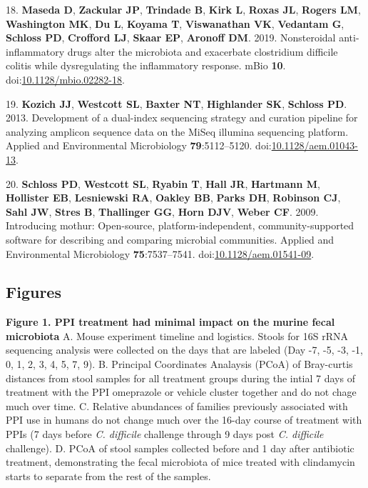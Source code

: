 \documentclass[11pt,]{article}
\begin{document}
\hypertarget{ref-Maseda2019}{}
18. \textbf{Maseda D}, \textbf{Zackular JP}, \textbf{Trindade B},
\textbf{Kirk L}, \textbf{Roxas JL}, \textbf{Rogers LM},
\textbf{Washington MK}, \textbf{Du L}, \textbf{Koyama T},
\textbf{Viswanathan VK}, \textbf{Vedantam G}, \textbf{Schloss PD},
\textbf{Crofford LJ}, \textbf{Skaar EP}, \textbf{Aronoff DM}. 2019.
Nonsteroidal anti-inflammatory drugs alter the microbiota and exacerbate
clostridium difficile colitis while dysregulating the inflammatory
response. mBio \textbf{10}.
doi:\href{https://doi.org/10.1128/mbio.02282-18}{10.1128/mbio.02282-18}.

\hypertarget{ref-Kozich2013}{}
19. \textbf{Kozich JJ}, \textbf{Westcott SL}, \textbf{Baxter NT},
\textbf{Highlander SK}, \textbf{Schloss PD}. 2013. Development of a
dual-index sequencing strategy and curation pipeline for analyzing
amplicon sequence data on the MiSeq illumina sequencing platform.
Applied and Environmental Microbiology \textbf{79}:5112--5120.
doi:\href{https://doi.org/10.1128/aem.01043-13}{10.1128/aem.01043-13}.

\hypertarget{ref-Schloss2009}{}
20. \textbf{Schloss PD}, \textbf{Westcott SL}, \textbf{Ryabin T},
\textbf{Hall JR}, \textbf{Hartmann M}, \textbf{Hollister EB},
\textbf{Lesniewski RA}, \textbf{Oakley BB}, \textbf{Parks DH},
\textbf{Robinson CJ}, \textbf{Sahl JW}, \textbf{Stres B},
\textbf{Thallinger GG}, \textbf{Horn DJV}, \textbf{Weber CF}. 2009.
Introducing mothur: Open-source, platform-independent,
community-supported software for describing and comparing microbial
communities. Applied and Environmental Microbiology
\textbf{75}:7537--7541.
doi:\href{https://doi.org/10.1128/aem.01541-09}{10.1128/aem.01541-09}.

\newpage

\subsection{Figures}\label{figures}

\textbf{Figure 1. PPI treatment had minimal impact on the murine fecal
microbiota} A. Mouse experiment timeline and logistics. Stools for 16S
rRNA sequencing analysis were collected on the days that are labeled
(Day -7, -5, -3, -1, 0, 1, 2, 3, 4, 5, 7, 9). B. Principal Coordinates
Analaysis (PCoA) of Bray-curtis distances from stool samples for all
treatment groups during the intial 7 days of treatment with the PPI
omeprazole or vehicle cluster together and do not chage much over time.
C. Relative abundances of families previously associated with PPI use in
humans do not change much over the 16-day course of treatment with PPIs
(7 days before \emph{C. difficile} challenge through 9 days post
\emph{C. difficile} challenge). D. PCoA of stool samples collected
before and 1 day after antibiotic treatment, demonstrating the fecal
microbiota of mice treated with clindamycin starts to separate from the
rest of the samples.
\end{document}
